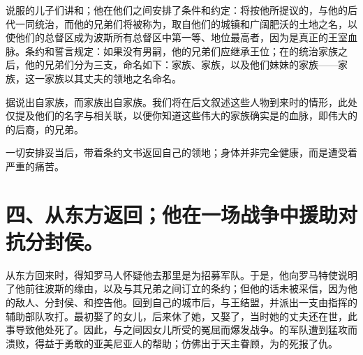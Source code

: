 说服的儿子们讲和；他在他们之间安排了条件和约定：将按他所提议的，与他的后代一同统治，而他的兄弟们将被称为，取自他们的城镇和广阔肥沃的土地之名，以使他们的总督区成为波斯所有总督区中第一等、地位最高者，因为是真正的王室血脉。条约和誓言规定：如果没有男嗣，他的兄弟们应继承王位；在的统治家族之后，他的兄弟们分为三支，命名如下：家族、家族，以及他们妹妹的家族——家族，这一家族以其丈夫的领地之名命名。\par

据说出自家族，而家族出自家族。我们将在后文叙述这些人物到来时的情形，此处仅提及他们的名字与相关联，以便你知道这些伟大的家族确实是的血脉，即伟大的的后裔，的兄弟。\par

一切安排妥当后，带着条约文书返回自己的领地；身体并非完全健康，而是遭受着严重的痛苦。\par


\section{四、从东方返回；他在一场战争中援助对抗分封侯。}

从东方回来时，得知罗马人怀疑他去那里是为招募军队。于是，他向罗马特使说明了他前往波斯的缘由，以及与其兄弟之间订立的条约；但他的话未被采信，因为他的敌人、分封侯、和控告他。回到自己的城市后，与王结盟，并派出一支由指挥的辅助部队攻打。最初娶了的女儿，后来休了她，又娶了，当时她的丈夫还在世，此事导致他处死了。因此，与之间因女儿所受的冤屈而爆发战争。的军队遭到猛攻而溃败，得益于勇敢的亚美尼亚人的帮助；仿佛出于天主眷顾，为的死报了仇。\par


